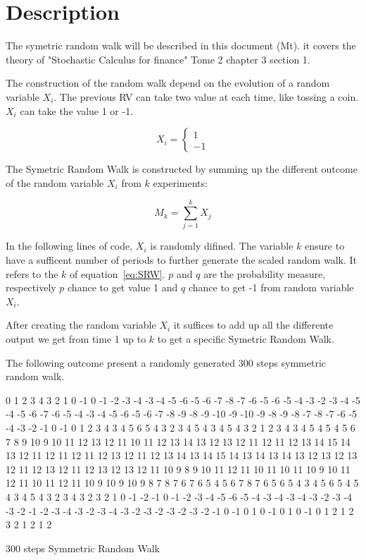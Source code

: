 \documentclass{article}
\begin{document}


\section{Description}
The symetric random walk will be described in this document (Mt). it covers the theory of "Stochastic Calculus for finance" Tome 2 chapter 3 section 1.

The construction of the random walk depend on the evolution of a random variable $X_i$. The previous RV can take two value at each time, like tossing a coin. $X_i$ can take the value 1 or -1.

\begin{equation}
 \label{eq:Xi}
X_i = 
\left \{{
  \begin{array}{c} 1 \\ -1 \end{array}
  }\right .
\end{equation}
 
The Symetric Random Walk is constructed by summing up the different outcome of the random variable $X_i$ from $k$ experiments:

\begin{equation}
\label{eq:SRW}
M_k = 
\sum_{j=1}^k X_j
\end{equation}

In the following lines of code, $X_i$ is randomly difined. The variable $k$ ensure to have a sufficent number of periods to further generate the scaled random walk.
It refers to the $k$ of equation~\ref{eq:SRW}.
$p$ and $q$ are the probability measure, respectively $p$ chance to get value 1 and $q$ chance to get -1 from random variable $X_i$.




After creating the random variable $X_i$ it suffices to add up all the differente output we get from time 1 up to $k$ to get a specific Symetric Random Walk.

The following outcome present a randomly generated 300 steps symmetric random walk.

\begin{table}[h]
0 1 2 3 4 3 2 1 0 -1 0 -1 -2 -3 -4 -3 -4 -5 -6 -5 -6 -7 -8 -7 -6 -5 -6 -5 -4 -3 -2 -3 -4 -5 -4 -5 -6 -7 -6 -5 -4 -3 -4 -5 -6 -5 -6 -7 -8 -9 -8 -9 -10 -9 -10 -9 -8 -9 -8 -7 -8 -7 -6 -5 -4 -3 -2 -1 0 -1 0 1 2 3 4 3 4 5 6 5 4 3 2 3 4 5 4 3 4 5 4 3 2 1 2 3 4 3 4 5 4 5 4 5 6 7 8 9 10 9 10 11 12 13 12 11 10 11 12 13 14 13 12 13 12 11 12 11 12 13 14 15 14 13 12 11 12 11 12 11 12 13 12 11 12 13 14 13 14 15 14 13 14 13 14 13 12 13 12 13 12 11 12 13 12 11 12 13 12 13 12 11 10 9 8 9 10 11 12 11 10 11 10 11 10 9 10 11 12 11 10 11 12 11 10 9 10 9 10 9 8 7 8 7 6 7 6 5 4 5 6 7 8 7 6 5 6 5 4 3 4 5 6 5 4 5 4 3 4 5 4 3 2 3 4 3 2 3 2 1 0 -1 -2 -1 0 -1 -2 -3 -4 -5 -6 -5 -4 -3 -4 -3 -4 -3 -2 -3 -4 -3 -2 -1 -2 -3 -4 -3 -2 -3 -4 -3 -2 -3 -2 -3 -2 -3 -2 -1 0 -1 0 1 0 -1 0 1 0 -1 0 1 2 1 2 3 2 1 2 1 2\caption{300 steps Symmetric Random Walk}
\end{table}
\end{document}
